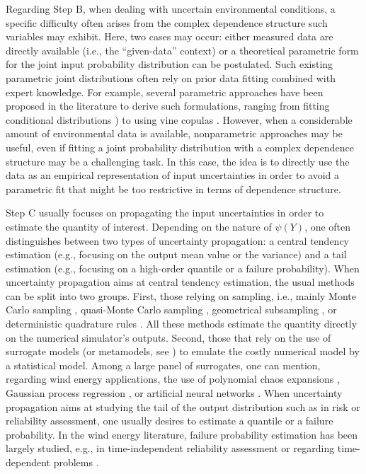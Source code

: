 Regarding Step B, when dealing with uncertain environmental conditions, a specific difficulty 
often arises from the complex dependence structure such variables may exhibit. 
Here, two cases may occur: either measured data are directly available (i.e., the ``given-data'' context) or a theoretical parametric form for the joint input probability distribution can be postulated.
Such existing parametric joint distributions often rely on prior data fitting combined with expert knowledge. 
For example, several parametric approaches have been proposed in the literature to derive such formulations, ranging from fitting conditional distributions \citep{vanem_fekhari_2023}) to using vine copulas \citep{li_zhan_2020}. 
However, when a considerable amount of environmental data is available, nonparametric approaches may be useful, even if fitting a joint probability distribution with a complex dependence structure may be a challenging task. 
In this case, the idea is to directly use the data as an empirical representation of input uncertainties in order to avoid a parametric fit that might be too restrictive in terms of dependence structure.


Step C usually focuses on propagating the input uncertainties in order to estimate the quantity of interest. 
Depending on the nature of $\psi(Y)$, one often distinguishes between two types of uncertainty propagation: a central tendency estimation (e.g., focusing on the output mean value or the variance) and a tail estimation (e.g., focusing on a high-order quantile or a failure probability). 
When uncertainty propagation aims at central tendency estimation, the usual methods can be split into two groups. 
First, those relying on sampling, i.e., mainly Monte Carlo sampling \citep{graf_2016}, quasi-Monte Carlo sampling \citep{muller_cheng_2018}, geometrical subsampling \citep{kanner_2018_OMAE}, or deterministic quadrature rules \citep{bos_2020}. 
All these methods estimate the quantity directly on the numerical simulator's outputs. 
Second, those that rely on the use of surrogate models (or metamodels, see ) to emulate the costly numerical model by a statistical model. 
Among a large panel of surrogates, one can mention, regarding wind energy applications, the use of polynomial chaos expansions \citep{dimitrov_kelly_2018, murcia_dimitrov_2018}, Gaussian process regression \citep{huchet_2019,teixeira_gp_2019,slot_sorensen_2020,wilkie_galasso_2021}, or artificial neural networks \citep{aoues_2023}. 
When uncertainty propagation aims at studying the tail of the output distribution such as in risk or reliability assessment, one usually desires to estimate a quantile or a failure probability. 
In the wind energy literature, failure probability estimation has been largely studied, e.g., in time-independent reliability assessment \citep{zwick_muskulus_2015,slot_sorensen_2020,wilkie_galasso_2021} or regarding time-dependent problems \citep{abdallah_lataniotis_2019,lataniotis_2019}.

